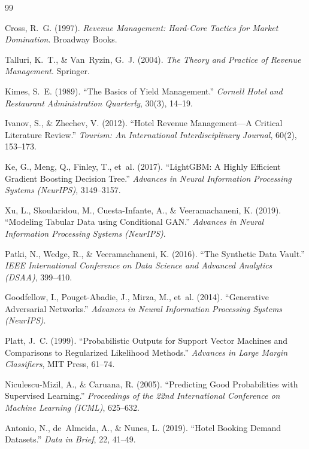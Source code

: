 \documentclass[12pt,a4paper,openany]{report}
\begin{document}
\begin{thebibliography}{99}

Cross, R.~G. (1997).
\textit{Revenue Management: Hard-Core Tactics for Market Domination}.
Broadway Books.

Talluri, K.~T., \& Van~Ryzin, G.~J. (2004).
\textit{The Theory and Practice of Revenue Management}.
Springer.

Kimes, S.~E. (1989).
``The Basics of Yield Management.''
\textit{Cornell Hotel and Restaurant Administration Quarterly}, 30(3), 14--19.

Ivanov, S., \& Zhechev, V. (2012).
``Hotel Revenue Management---A Critical Literature Review.''
\textit{Tourism: An International Interdisciplinary Journal}, 60(2), 153--173.

Ke, G., Meng, Q., Finley, T., et~al. (2017).
``LightGBM: A Highly Efficient Gradient Boosting Decision Tree.''
\textit{Advances in Neural Information Processing Systems (NeurIPS)}, 3149--3157.

Xu, L., Skoularidou, M., Cuesta-Infante, A., \& Veeramachaneni, K. (2019).
``Modeling Tabular Data using Conditional GAN.''
\textit{Advances in Neural Information Processing Systems (NeurIPS)}.

Patki, N., Wedge, R., \& Veeramachaneni, K. (2016).
``The Synthetic Data Vault.''
\textit{IEEE International Conference on Data Science and Advanced Analytics (DSAA)}, 399--410.

Goodfellow, I., Pouget-Abadie, J., Mirza, M., et~al. (2014).
``Generative Adversarial Networks.''
\textit{Advances in Neural Information Processing Systems (NeurIPS)}.

Platt, J.~C. (1999).
``Probabilistic Outputs for Support Vector Machines and Comparisons to Regularized Likelihood Methods.''
\textit{Advances in Large Margin Classifiers}, MIT Press, 61--74.

Niculescu-Mizil, A., \& Caruana, R. (2005).
``Predicting Good Probabilities with Supervised Learning.''
\textit{Proceedings of the 22nd International Conference on Machine Learning (ICML)}, 625--632.

Antonio, N., de~Almeida, A., \& Nunes, L. (2019).
``Hotel Booking Demand Datasets.''
\textit{Data in Brief}, 22, 41--49.


\end{thebibliography}
\end{document}
